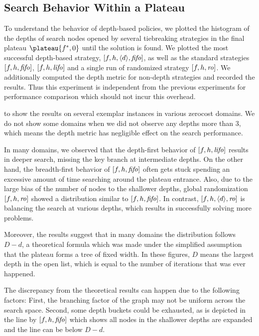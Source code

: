 \subsection{Search Behavior Within a Plateau}

To understand the behavior of depth-based policies, we plotted the
histogram of the depths of search nodes opened by several tiebreaking
strategies in the final plateau $\plateau{f^*,0}$ until the solution is
found.  We plotted the most successful depth-based strategy,
$[f,h,{\left<d\right>},{\text{\textit{fifo}}}]$, as well as the standard strategies $[f,h,{\text{\textit{fifo}}}]$,
$[f,h,{\text{\textit{lifo}}}]$ and a single run of randomized strategy $[f,h,{\text{\textit{ro}}}]$.
We additionally computed the depth metric for non-depth strategies and
recorded the results. Thus this experiment is independent from the
previous experiments for performance comparison which should not incur
this overhead.


 to  show the results on several exemplar instances in
various zerocost domains.  We do not show some domains when we did not observe any depths more than 3, which means
the depth metric has negligible effect on the search performance.

In many domains, we observed that the depth-first behavior of
$[f,h,{\text{\textit{lifo}}}]$ results in deeper search, missing the key branch at
intermediate depths.  On the other hand, the breadth-first behavior of
$[f,h,{\text{\textit{fifo}}}]$ often gets stuck spending an excessive amount of time
searching around the plateau entrance.  Also, due to the large bias of
the number of nodes to the shallower depths, global randomization
$[f,h,{\text{\textit{ro}}}]$ showed a distribution similar to $[f,h,{\text{\textit{fifo}}}]$.
In contrast, $[f,h,{\left<d\right>},{\text{\textit{ro}}}]$ is balancing the search at various depths, which
results in successfully solving more problems.

Moreover, the results suggest that in many domains the distribution follows
$D-d$, a theoretical formula which was made under the simplified
assumption that the plateau forms a tree of fixed width. In these
figures, $D$ means the largest depth in the open list, which is equal to
the number of iterations that was ever happened.

The discrepancy from the theoretical results can happen due to the
following factors: First, the branching factor of the graph may not be
uniform across the search space. Second, some depth buckets could be
exhausted, as is depicted in the line by $[f,h,{\text{\textit{fifo}}}]$ which
shows all nodes in the shallower depths are expanded and the line can be below $D-d$.

